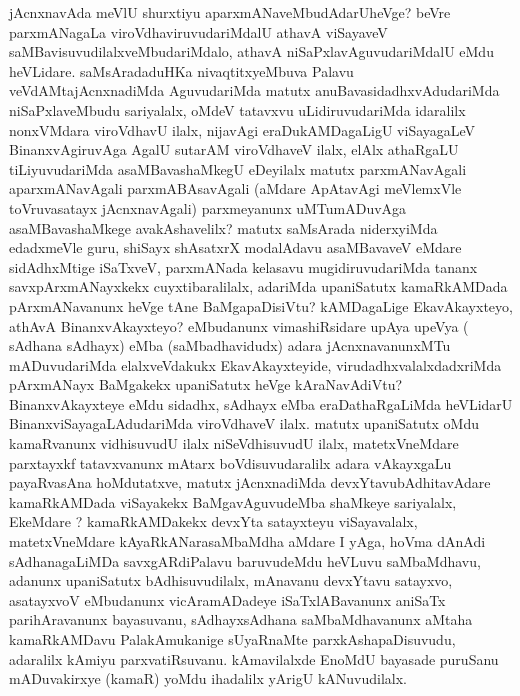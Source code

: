 


\begin{artha}
jAcnxnavAda meVlU shurxtiyu aparxmANaveMbudAdarUheVge? beVre
parxmANagaLa viroVdhaviruvudariMdalU athavA viSayaveV
saMBavisuvudilalxveMbudariMdalo, athavA niSaPxlavAguvudariMdalU eMdu
heVLidare. saMsAradaduHKa nivaqtitxyeMbuva Palavu veVdAMtajAcnxnadiMda
AguvudariMda matutx anuBavasidadhxvAdudariMda niSaPxlaveMbudu
sariyalalx, oMdeV tatavxvu uLidiruvudariMda idaralilx nonxVMdara
viroVdhavU ilalx, nijavAgi eraDukAMDagaLigU viSayagaLeV
BinanxvAgiruvAga AgalU sutarAM viroVdhaveV ilalx, elAlx athaRgaLU
tiLiyuvudariMda asaMBavashaMkegU eDeyilalx matutx parxmANavAgali
aparxmANavAgali parxmABAsavAgali (aMdare ApAtavAgi meVlemxVle
toVruvasatayx jAcnxnavAgali) parxmeyanunx uMTumADuvAga
asaMBavashaMkege avakAshavelilx? matutx saMsArada niderxyiMda
edadxmeVle guru, shiSayx shAsatxrX modalAdavu asaMBavaveV eMdare
 sidAdhxMtige iSaTxveV, parxmANada kelasavu mugidiruvudariMda tananx
savxpArxmANayxkekx cuyxtibaralilalx, adariMda upaniSatutx kamaRkAMDada
pArxmANavanunx heVge tAne BaMgapaDisiVtu? kAMDagaLige EkavAkayxteyo,
athAvA BinanxvAkayxteyo? eMbudanunx vimashiRsidare upAya upeVya (
sAdhana sAdhayx) eMba (saMbadhavidudx) adara jAcnxnavanunxMTu
mADuvudariMda elalxveVdakukx EkavAkayxteyide, virudadhxvalalxdadxriMda
pArxmANayx BaMgakekx upaniSatutx heVge kAraNavAdiVtu?
BinanxvAkayxteye eMdu sidadhx, sAdhayx eMba eraDathaRgaLiMda heVLidarU
BinanxviSayagaLAdudariMda  viroVdhaveV ilalx. matutx upaniSatutx oMdu
kamaRvanunx vidhisuvudU ilalx niSeVdhisuvudU ilalx, matetxVneMdare
parxtayxkf tatavxvanunx mAtarx boVdisuvudaralilx adara vAkayxgaLu
payaRvasAna hoMdutatxve, matutx jAcnxnadiMda devxYtavubAdhitavAdare
kamaRkAMDada viSayakekx BaMgavAguvudeMba shaMkeye sariyalalx, EkeMdare
? kamaRkAMDakekx devxYta satayxteyu viSayavalalx, matetxVneMdare
kAyaRkANarasaMbaMdha aMdare I yAga, hoVma dAnAdi sAdhanagaLiMDa
savxgARdiPalavu baruvudeMdu heVLuvu saMbaMdhavu, adanunx upaniSatutx
bAdhisuvudilalx, mAnavanu devxYtavu satayxvo, asatayxvoV eMbudanunx
vicAramADadeye iSaTxlABavanunx aniSaTx parihAravanunx bayasuvanu,
sAdhayxsAdhana saMbaMdhavanunx aMtaha kamaRkAMDavu PalakAmukanige
sUyaRnaMte parxkAshapaDisuvudu, adaralilx  kAmiyu parxvatiRsuvanu.
kAmavilalxde EnoMdU bayasade puruSanu mADuvakirxye (kamaR) yoMdu
ihadalilx  yArigU kANuvudilalx.
\end{artha}

